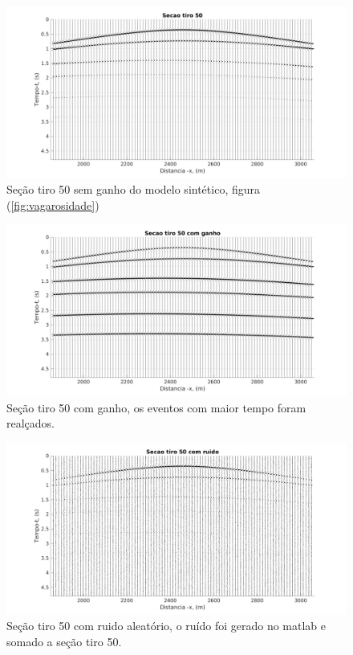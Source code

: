 \begin{landscape}
\begin{figure}[H]
\centering
\includegraphics[totalheight=14cm]{figuras/cap2/secao_tiro50.pdf}
\caption{Seção tiro 50 sem ganho do modelo sintético, figura (\ref{fig:vagarosidade})}
\label{fig:tiro_50}
\end{figure}
\end{landscape}

\begin{landscape}
\begin{figure}[H]
\centering
\includegraphics[totalheight=14cm]{figuras/cap2/secao_tiro50_ganho.pdf}
\caption{Seção tiro 50 com ganho, os eventos com maior tempo foram realçados.}
\label{fig:tiro_50gain}
\end{figure}
\end{landscape}

\begin{landscape}
\begin{figure}[H]
\centering
\includegraphics[totalheight=14cm]{figuras/cap2/secao_tiro50_ruido.pdf}
\caption{Seção tiro 50 com ruido aleatório, o ruído foi gerado no matlab e somado a seção tiro 50.}
\label{fig:tiro_50ruido}
\end{figure}
\end{landscape}

